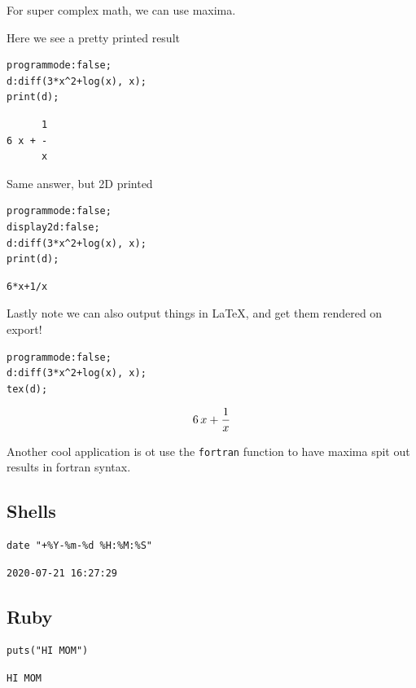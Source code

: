 \documentclass[11pt]{article}
\begin{document}
For super complex math, we can use maxima.  

Here we see a  pretty printed result

\begin{verbatim}
programmode:false;
d:diff(3*x^2+log(x), x);
print(d);
\end{verbatim}

\begin{verbatim}
      1
6 x + - 
      x
\end{verbatim}

Same answer, but 2D printed

\begin{verbatim}
programmode:false;
display2d:false;
d:diff(3*x^2+log(x), x);
print(d);
\end{verbatim}

\begin{verbatim}
6*x+1/x 
\end{verbatim}

Lastly note we can also output things in \LaTeX{}, and get them rendered on export!

\begin{verbatim}
programmode:false;
d:diff(3*x^2+log(x), x);
tex(d);
\end{verbatim}

$$6\,x+{{1}\over{x}}$$

Another cool application is ot use the \texttt{fortran} function to have maxima spit out results in fortran syntax.

\subsection{Shells}
\label{sec:org458ae63}

\begin{verbatim}
date "+%Y-%m-%d %H:%M:%S"
\end{verbatim}

\begin{verbatim}
2020-07-21 16:27:29
\end{verbatim}

\subsection{Ruby}
\label{sec:org86b9900}

\begin{verbatim}
puts("HI MOM")
\end{verbatim}

\begin{verbatim}
HI MOM
\end{verbatim}
\end{document}
